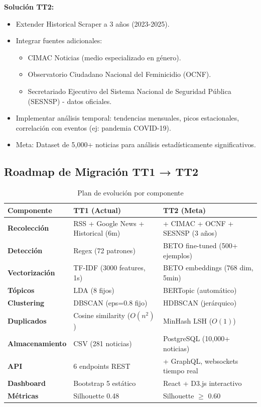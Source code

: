 \textbf{Solución TT2:}
\begin{itemize}
    \item Extender Historical Scraper a 3 años (2023-2025).
    \item Integrar fuentes adicionales:
    \begin{itemize}
        \item CIMAC Noticias (medio especializado en género).
        \item Observatorio Ciudadano Nacional del Feminicidio (OCNF).
        \item Secretariado Ejecutivo del Sistema Nacional de Seguridad Pública (SESNSP) - datos oficiales.
    \end{itemize}
    \item Implementar análisis temporal: tendencias mensuales, picos estacionales, correlación con eventos (ej: pandemia COVID-19).
    \item Meta: Dataset de 5,000+ noticias para análisis estadísticamente significativos.
\end{itemize}

\subsection{Roadmap de Migración TT1 → TT2}

\begin{table}[h]
\centering
\caption{Plan de evolución por componente}
\begin{tabular}{|l|l|l|}
\hline
\textbf{Componente} & \textbf{TT1 (Actual)} & \textbf{TT2 (Meta)} \\ \hline
\textbf{Recolección} & RSS + Google News + Historical (6m) & + CIMAC + OCNF + SESNSP (3 años) \\ \hline
\textbf{Detección} & Regex (72 patrones) & BETO fine-tuned (500+ ejemplos) \\ \hline
\textbf{Vectorización} & TF-IDF (3000 features, 1s) & BETO embeddings (768 dim, 5min) \\ \hline
\textbf{Tópicos} & LDA (8 fijos) & BERTopic (automático) \\ \hline
\textbf{Clustering} & DBSCAN (eps=0.8 fijo) & HDBSCAN (jerárquico) \\ \hline
\textbf{Duplicados} & Cosine similarity ($O(n^2)$) & MinHash LSH ($O(1)$) \\ \hline
\textbf{Almacenamiento} & CSV (281 noticias) & PostgreSQL (10,000+ noticias) \\ \hline
\textbf{API} & 6 endpoints REST & + GraphQL, websockets tiempo real \\ \hline
\textbf{Dashboard} & Bootstrap 5 estático & React + D3.js interactivo \\ \hline
\textbf{Métricas} & Silhouette 0.48 & Silhouette $\geq$ 0.60 \\ \hline
\end{tabular}
\end{table}

